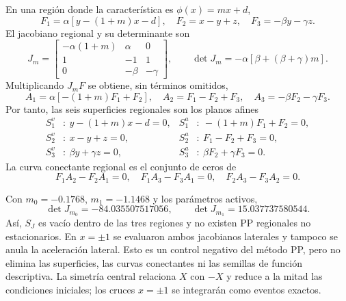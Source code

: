 En una región donde la característica es $\phi(x)=mx+d$,
\begin{equation}
 F_1=\alpha[y-(1+m)x-d],\quad
 F_2=x-y+z,\quad F_3=-\beta y-\gamma z.
 \label{casegt:eq:chua-pwl-field}
\end{equation}
El jacobiano regional y su determinante son
\begin{equation}
 J_m=
 \begin{bmatrix}
 -\alpha(1+m)&\alpha&0\\
 1&-1&1\\
 0&-\beta&-\gamma
 \end{bmatrix},
 \qquad
 \det J_m=-\alpha[\beta+(\beta+\gamma)m].
 \label{casegt:eq:chua-pwl-J}
\end{equation}
Multiplicando $J_mF$ se obtiene, sin términos omitidos,
\begin{equation}
 A_1=\alpha[-(1+m)F_1+F_2],\quad
 A_2=F_1-F_2+F_3,\quad
 A_3=-\beta F_2-\gamma F_3.
 \label{casegt:eq:chua-pwl-A}
\end{equation}
Por tanto, las seis superficies regionales son los planos afines
\begin{align}
 S_1^v&:\ y-(1+m)x-d=0,&
 S_1^a&:\ -(1+m)F_1+F_2=0,\nonumber\\
 S_2^v&:\ x-y+z=0,&
 S_2^a&:\ F_1-F_2+F_3=0,\\
 S_3^v&:\ \beta y+\gamma z=0,&
 S_3^a&:\ \beta F_2+\gamma F_3=0.
 \label{casegt:eq:chua-pwl-surfaces}
\end{align}
La curva conectante regional es el conjunto de ceros de
\begin{equation}
 F_1A_2-F_2A_1=0,
 \quad F_1A_3-F_3A_1=0,
 \quad F_2A_3-F_3A_2=0.
 \label{casegt:eq:chua-pwl-CC}
\end{equation}

Con $m_0=-0.1768$, $m_1=-1.1468$ y los parámetros activos,
\begin{equation}
 \det J_{m_0}=-84.035507517056,
 \qquad
 \det J_{m_1}=15.037737580544.
 \label{casegt:eq:chua-pwl-dets}
\end{equation}
Así, $S_J$ es vacío dentro de las tres regiones y no existen PP regionales no
estacionarios. En $x=\pm1$ se evaluaron ambos jacobianos laterales y tampoco se
anula la aceleración lateral. Esto es un control negativo del método PP, pero
no elimina las superficies, las curvas conectantes ni las semillas de función
descriptiva. La simetría central relaciona $X$ con $-X$ y reduce a la mitad las
condiciones iniciales; los cruces $x=\pm1$ se integrarán como eventos exactos.

